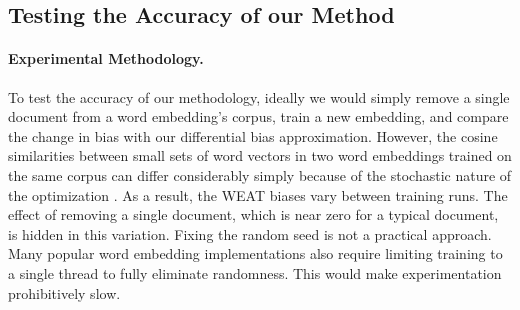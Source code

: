 \documentclass{article}
\newcommand{\xhdr}[1]{\paragraph*{\bf {#1.}}}
\begin{document}

                                 

\subsection{Testing the Accuracy of our Method}
\xhdr{Experimental Methodology}
To test the accuracy of our methodology, ideally we would simply remove a single document from a word embedding's corpus, train a new embedding, and compare the change in bias with our differential bias approximation.
However, the cosine similarities between small sets of word vectors in two word embeddings trained on the same corpus can differ considerably simply because of the stochastic nature of the optimization \cite{stability}.
As a result, the WEAT biases vary between training runs. 
The effect of removing a single document, which is near zero for a typical document, is hidden in this variation.
Fixing the random seed is not a practical approach.
Many popular word embedding implementations also require limiting training to a single thread to fully eliminate randomness.
This would make experimentation prohibitively slow.
\end{document}
